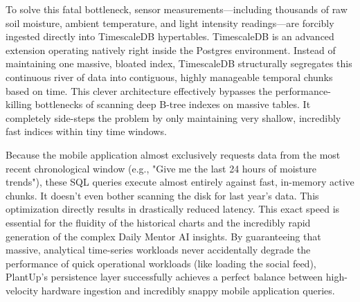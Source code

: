 To solve this fatal bottleneck, sensor measurements—including thousands of raw soil moisture, ambient temperature, and light intensity readings—are forcibly ingested directly into TimescaleDB hypertables. TimescaleDB is an advanced extension operating natively right inside the Postgres environment. Instead of maintaining one massive, bloated index, TimescaleDB structurally segregates this continuous river of data into contiguous, highly manageable temporal chunks based on time. This clever architecture effectively bypasses the performance-killing bottlenecks of scanning deep B-tree indexes on massive tables. It completely side-steps the problem by only maintaining very shallow, incredibly fast indices within tiny time windows. 

Because the mobile application almost exclusively requests data from the most recent chronological window (e.g., "Give me the last 24 hours of moisture trends"), these SQL queries execute almost entirely against fast, in-memory active chunks. It doesn't even bother scanning the disk for last year's data. This optimization directly results in drastically reduced latency. This exact speed is essential for the fluidity of the historical charts and the incredibly rapid generation of the complex Daily Mentor AI insights. By guaranteeing that massive, analytical time-series workloads never accidentally degrade the performance of quick operational workloads (like loading the social feed), PlantUp's persistence layer successfully achieves a perfect balance between high-velocity hardware ingestion and incredibly snappy mobile application queries.
